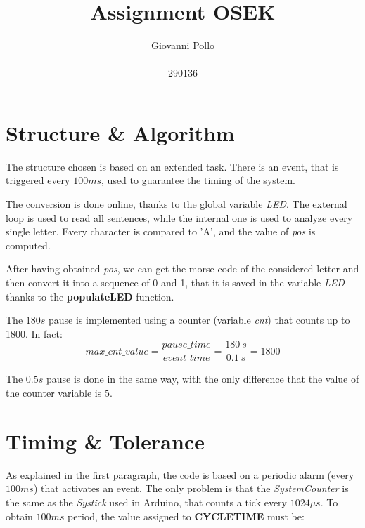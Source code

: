 \documentclass[a4paper]{article}
\title{\Huge Assignment OSEK}
\author{\huge Giovanni Pollo \\ \\ \huge 290136}
\date{}
\begin{document}
\begin{titlepage}
  \centering
  \vspace{2px}
\end{titlepage}
\maketitle




\newpage


\section{Structure \& Algorithm}
The structure chosen is based on an extended task. There is an event, that is triggered every \(100ms\), used to guarantee the timing of the system.

The conversion is done online, thanks to the global variable \emph{LED}. The external loop is used to read all sentences, while the internal one is used to analyze every single letter. Every character is compared to 'A', and the value of \emph{pos} is computed.

After having obtained \emph{pos}, we can get the morse code of the considered letter and then convert it into a sequence of 0 and 1, that it is saved in the variable \emph{LED} thanks to the \textbf{populateLED} function.

The \(180s\) pause is implemented using a counter (variable \emph{cnt}) that counts up to 1800. In fact:
\begin{equation}
  max\_cnt\_value = \frac{pause\_time}{event\_time} = \frac{180\ s}{0.1\ s} = 1800
\end{equation}

The \(0.5s\) pause is done in the same way, with the only difference that the value of the counter variable is \(5\).


\section{Timing \& Tolerance}

As explained in the first paragraph, the code is based on a periodic alarm (every \(100ms\)) that activates an event. The only problem is that the \emph{SystemCounter} is the same as the \emph{Systick} used in Arduino, that counts a tick every \(1024 \mu s\). To obtain \(100ms\) period, the value assigned to  \textbf{CYCLETIME} must be:
\end{document}
